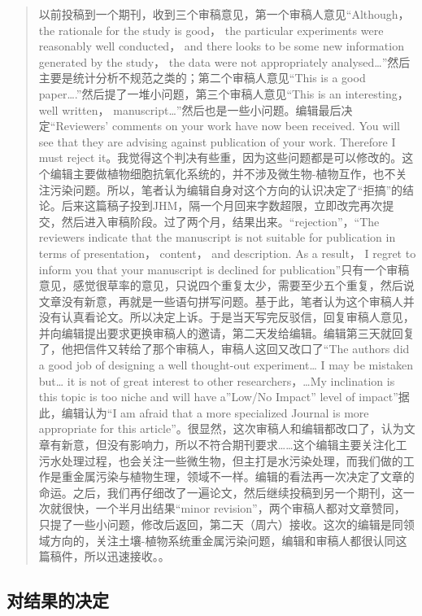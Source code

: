 \documentclass[]{book}
\begin{document}
\begin{quote}
以前投稿到一个期刊，收到三个审稿意见，第一个审稿人意见``Although， the
rationale for the study is good， the particular experiments were
reasonably well conducted， and there looks to be some new information
generated by the study， the data were not appropriately
analysed\ldots{}''然后主要是统计分析不规范之类的；第二个审稿人意见``This
is a good paper\ldots{}.''然后提了一堆小问题，第三个审稿人意见``This is
an interesting， well written，
manuscript\ldots{}''然后也是一些小问题。编辑最后决定``Reviewers'
comments on your work have now been received. You will see that they are
advising against publication of your work. Therefore I must reject
it。我觉得这个判决有些重，因为这些问题都是可以修改的。这个编辑主要做植物细胞抗氧化系统的，并不涉及微生物-植物互作，也不关注污染问题。所以，笔者认为编辑自身对这个方向的认识决定了``拒搞''的结论。后来这篇稿子投到JHM，隔一个月回来字数超限，立即改完再次提交，然后进入审稿阶段。过了两个月，结果出来。``rejection''，``The
reviewers indicate that the manuscript is not suitable for publication
in terms of presentation， content， and description. As a result， I
regret to inform you that your manuscript is declined for
publication''只有一个审稿意见，感觉很草率的意见，只说四个重复太少，需要至少五个重复，然后说文章没有新意，再就是一些语句拼写问题。基于此，笔者认为这个审稿人并没有认真看论文。所以决定上诉。于是当天写完反驳信，回复审稿人意见，并向编辑提出要求更换审稿人的邀请，第二天发给编辑。编辑第三天就回复了，他把信件又转给了那个审稿人，审稿人这回又改口了``The
authors did a good job of designing a well thought-out
experiment\ldots{} I may be mistaken but\ldots{} it is not of great
interest to other researchers，\ldots{}My inclination is this topic is
too niche and will have a''Low/No Impact'' level of
impact''据此，编辑认为``I am afraid that a more specialized Journal is
more appropriate for this
article''。很显然，这次审稿人和编辑都改口了，认为文章有新意，但没有影响力，所以不符合期刊要求\ldots{}\ldots{}这个编辑主要关注化工污水处理过程，也会关注一些微生物，但主打是水污染处理，而我们做的工作是重金属污染与植物生理，领域不一样。编辑的看法再一次决定了文章的命运。之后，我们再仔细改了一遍论文，然后继续投稿到另一个期刊，这一次就很快，一个半月出结果``minor
revision''，两个审稿人都对文章赞同，只提了一些小问题，修改后返回，第二天（周六）接收。这次的编辑是同领域方向的，关注土壤-植物系统重金属污染问题，编辑和审稿人都很认同这篇稿件，所以迅速接收。。
\end{quote}

\subsection{对结果的决定}
\end{document}
